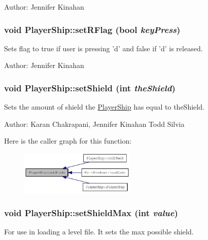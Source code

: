 Author: Jennifer Kinahan \hypertarget{class_player_ship_a56bef96439b3cd3e061b391808ec2e98}{
\subsubsection[{setRFlag}]{\setlength{\rightskip}{0pt plus 5cm}void PlayerShip::setRFlag (bool {\em keyPress})}}
\label{class_player_ship_a56bef96439b3cd3e061b391808ec2e98}
Sets flag to true if user is pressing 'd' and false if 'd' is released.

Author: Jennifer Kinahan \hypertarget{class_player_ship_a2d736a12bc12fa351810aea18ccd1433}{
\subsubsection[{setShield}]{\setlength{\rightskip}{0pt plus 5cm}void PlayerShip::setShield (int {\em theShield})}}
\label{class_player_ship_a2d736a12bc12fa351810aea18ccd1433}
Sets the amount of shield the \hyperlink{class_player_ship}{PlayerShip} has equal to theShield.

Author: Karan Chakrapani, Jennifer Kinahan Todd Silvia 

Here is the caller graph for this function:\nopagebreak
\begin{figure}[H]
\begin{center}
\leavevmode
\includegraphics[width=156pt]{class_player_ship_a2d736a12bc12fa351810aea18ccd1433_icgraph}
\end{center}
\end{figure}
\hypertarget{class_player_ship_a26c3da7df2435e3d6b114db177ea1e92}{
\subsubsection[{setShieldMax}]{\setlength{\rightskip}{0pt plus 5cm}void PlayerShip::setShieldMax (int {\em value})}}
\label{class_player_ship_a26c3da7df2435e3d6b114db177ea1e92}
For use in loading a level file. It sets the max possible shield.

